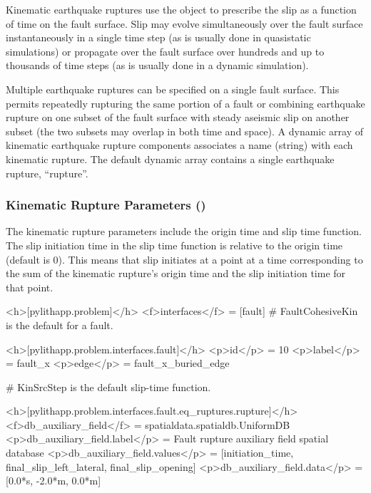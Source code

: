 Kinematic earthquake ruptures use the  object
to prescribe the slip as a function of time on the fault surface. Slip
may evolve simultaneously over the fault surface instantaneously in a
single time step (as is usually done in quasistatic simulations) or
propagate over the fault surface over hundreds and up to thousands of
time steps (as is usually done in a dynamic simulation).

Multiple earthquake ruptures can be specified on a single fault surface.
This permits repeatedly rupturing the same portion of a fault or combining
earthquake rupture on one subset of the fault surface with steady
aseismic slip on another subset (the two subsets may overlap in both
time and space). A dynamic array of kinematic earthquake rupture components
associates a name (string) with each kinematic rupture. The default
dynamic array contains a single earthquake rupture, ``rupture''. 


\subsubsection{Kinematic Rupture Parameters (\protect{})}

The kinematic rupture parameters include the origin time and slip
time function. The slip initiation time in the slip time function
is relative to the origin time (default is 0). This means that slip
initiates at a point at a time corresponding to the sum of the kinematic
rupture's origin time and the slip initiation time for that point.

\begin{cfg}
<h>[pylithapp.problem]</h>
<f>interfaces</f> = [fault]
# FaultCohesiveKin is the default for a fault.

<h>[pylithapp.problem.interfaces.fault]</h>
<p>id</p> = 10
<p>label</p> = fault_x
<p>edge</p> = fault_x_buried_edge

# KinSrcStep is the default slip-time function.

<h>[pylithapp.problem.interfaces.fault.eq_ruptures.rupture]</h>
<f>db_auxiliary_field</f> = spatialdata.spatialdb.UniformDB
<p>db_auxiliary_field.label</p> = Fault rupture auxiliary field spatial database
<p>db_auxiliary_field.values</p> = [initiation_time, final_slip_left_lateral, final_slip_opening]
<p>db_auxiliary_field.data</p> = [0.0*s, -2.0*m, 0.0*m]
\end{cfg}

